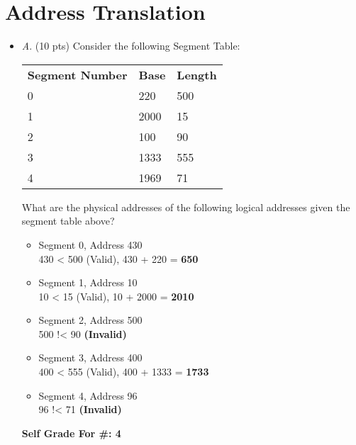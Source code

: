 \documentclass[conference]{IEEEtran}
\begin{document}
\section{Address Translation}
\begin{itemize}
	\item \textit{A}. (10 pts) Consider the following Segment Table:
		\begin{table}[H]
			\centering
			\begin{tabular}{lll}
				\textbf{Segment Number} & \textbf{Base} & \textbf{Length} \\
				0 & 220 & 500 \\
				1 & 2000 & 15 \\
				2 & 100 & 90 \\
				3 & 1333 & 555 \\
				4 & 1969 & 71
			\end{tabular}
		\end{table}
	
	What are the physical addresses of the following logical addresses given the segment table
	above?
	\begin{itemize} 
		\item {Segment 0, Address 430} \\	
		430 < 500 (Valid), 430 + 220 = \textbf{650}
		\item {Segment 1, Address 10} \\
		10 < 15 (Valid), 10 + 2000 = \textbf{2010} 
		\item {Segment 2, Address 500} \\
		500 !< 90 \textbf{(Invalid)} 
		\item {Segment 3, Address 400} \\
		400 < 555 (Valid), 400 + 1333 = \textbf{1733}
		\item {Segment 4, Address 96} \\
		96 !< 71 \textbf{(Invalid)}
	\end{itemize} 

\begin{center}
\textbf{Self Grade For \#: 4}
\end{center}

\end{itemize}
\end{document}
